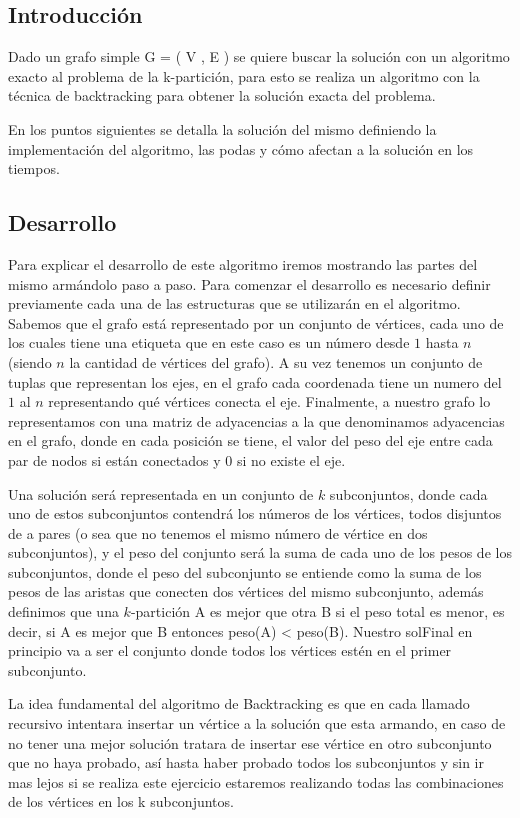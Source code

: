 \subsection{Introducción}

Dado un grafo simple G = ( V , E ) se quiere buscar la solución con un algoritmo exacto al problema de la k-partición, para esto se realiza un algoritmo con la técnica de backtracking para obtener la solución exacta del problema.

En los puntos siguientes se detalla la solución del mismo definiendo la implementación del algoritmo, las podas y  cómo afectan a la solución en los tiempos.

\subsection{Desarrollo}
Para explicar el desarrollo de este algoritmo iremos mostrando las partes del mismo armándolo paso a paso. Para comenzar el desarrollo es necesario definir previamente cada una de las estructuras que se utilizarán en el algoritmo. Sabemos que el grafo está representado por un conjunto de vértices, cada uno de los cuales tiene una etiqueta que en este caso es un número desde $1$ hasta $n$ (siendo $n$ la cantidad de vértices del grafo). A su vez tenemos un conjunto de tuplas que representan los ejes, en el grafo cada coordenada tiene un numero del $1$ al $n$ representando qué vértices conecta el eje. Finalmente, a nuestro grafo lo representamos con una matriz de adyacencias a la que denominamos adyacencias en el grafo, donde en cada posición se tiene, el valor del peso del eje entre cada par de nodos si están conectados y $0$ si no existe el eje.

Una solución será representada en un conjunto de $k$ subconjuntos, donde cada uno de estos subconjuntos contendrá los números de los vértices, todos disjuntos de a pares (o sea que no tenemos el mismo número de vértice en dos subconjuntos), y el peso del conjunto será la suma de cada uno de los pesos de los subconjuntos, donde el peso del subconjunto se entiende como la suma de los pesos de las aristas que conecten dos vértices del mismo subconjunto, además definimos que una $k$-partición A es mejor que otra B si el peso total es menor, es decir, si A es mejor que B entonces peso(A) < peso(B). Nuestro solFinal en principio va a ser el conjunto donde todos los vértices estén en el primer subconjunto.

La idea fundamental del algoritmo de Backtracking  es que en cada llamado recursivo intentara insertar un vértice a la solución que esta armando, en caso de no tener una mejor solución tratara de insertar ese vértice en otro subconjunto que no haya probado, así hasta haber probado todos los subconjuntos y sin ir mas lejos si se realiza este ejercicio estaremos realizando todas las combinaciones de los vértices en los k subconjuntos.	

